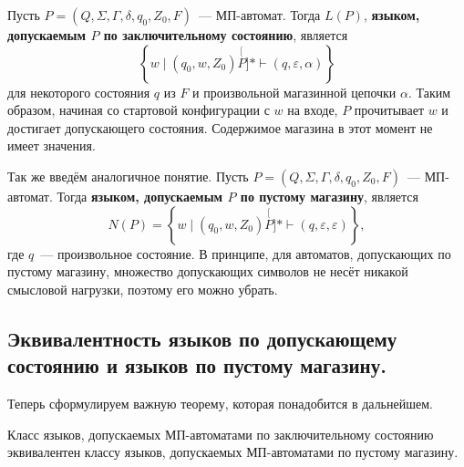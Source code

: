 \documentclass[a4paper,12pt]{article}
\begin{document}
Пусть $P = (Q, \Sigma, \Gamma, \delta, q_0, Z_0, F)$~--- МП-автомат. Тогда $L(P)$, \textbf{языком, допускаемым $P$ по заключительному состоянию}, является
\[\left\{w \mid (q_0, w, Z_0) \stackrel[P]{*}{\vdash} (q, \varepsilon, \alpha)\right\}\]
для некоторого состояния $q$ из $F$ и произвольной магазинной цепочки $\alpha$. Таким образом, начиная со стартовой конфигурации с $w$ на входе, $P$ прочитывает $w$ и достигает допускающего состояния. Содержимое магазина в этот момент не имеет значения.

Так же введём аналогичное понятие.
Пусть $P = (Q, \Sigma, \Gamma, \delta, q_0, Z_0, F)$~--- МП-автомат. Тогда \textbf{языком, допускаемым $P$ по пустому магазину}, является 
\[N(P) = \left\{w \mid (q_0, w, Z_0) \stackrel[P]{*}{\vdash} (q, \varepsilon, \varepsilon)\right\},\]
где $q$~--- произвольное состояние. В принципе, для автоматов, допускающих по пустому магазину, множество допускающих символов не несёт никакой смысловой нагрузки, поэтому его можно убрать.

\subsection{Эквивалентность языков по допускающему состоянию и языков по пустому магазину.}
Теперь сформулируем важную теорему, которая понадобится в дальнейшем.
\begin{theorem}
	Класс языков, допускаемых МП-автоматами по заключительному состоянию эквивалентен классу языков, допускаемых МП-автоматами по пустому магазину.
\end{theorem}
\end{document}

